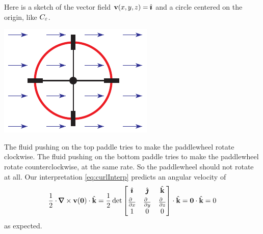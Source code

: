 \begin{eg}\label{eg:curlInterpc}
Here is a sketch of the vector field $\mathbf{v}(x,y,z) = \hat{\pmb{\imath}}$
and a circle centered on the origin, like $C_\varepsilon$. 
\begin{nfig}
\begin{center}
    \includegraphics{transCurl.pdf}
\end{center}
\end{nfig}
The fluid pushing on the top paddle tries to make the paddlewheel rotate
clockwise. The fluid pushing on the bottom paddle tries to make the 
paddlewheel rotate counterclockwise, at the same rate.
So the paddlewheel should not rotate at all.
Our interpretation \eqref{eq:curlInterp} predicts an angular velocity of
\begin{align*}
\frac{1}{2}\cdot\vnabla\times\vv(\vZero)\cdot\hk 
=\frac{1}{2}
\det\left[\begin{matrix}
          \hi & \hj &\hk \\[0.05in]
          \frac{\partial\hfill}{\partial x} &
              \frac{\partial\hfill}{\partial y} &
              \frac{\partial\hfill}{\partial z}  \\
           1 & 0 & 0
          \end{matrix}
     \right] \cdot\hk
=\vZero\cdot\hk
=0
\end{align*}
as expected.
\end{eg}









